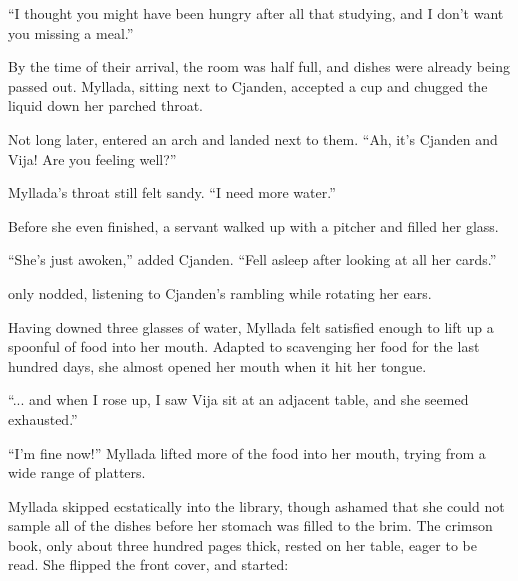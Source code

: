 ``I thought you might have been hungry after all that studying, and I don't want you missing a meal.''

By the time of their arrival, the room was half full, and dishes were already being passed out. Myllada, sitting next to Cjanden, accepted a cup and chugged the liquid down her parched throat.

Not long later, \yronsyncra{} entered an arch and landed next to them. ``Ah, it's Cjanden and Vija! Are you feeling well?''

Myllada's throat still felt sandy. ``I need more water.''

Before she even finished, a servant walked up with a pitcher and filled her glass.

``She's just awoken,'' added Cjanden. ``Fell asleep after looking at all her cards.''

\yronsyncra{} only nodded, listening to Cjanden's rambling while rotating her ears.

Having downed three glasses of water, Myllada felt satisfied enough to lift up a spoonful of food into her mouth. Adapted to scavenging her food for the last hundred days, she almost opened her mouth when it hit her tongue.

``... and when I rose up, I saw Vija sit at an adjacent table, and she seemed exhausted.''

``I'm fine now!'' Myllada lifted more of the food into her mouth, trying from a wide range of platters.

\centeredstars

Myllada skipped ecstatically into the library, though ashamed that she could not sample all of the dishes before her stomach was filled to the brim. The crimson book, only about three hundred pages thick, rested on her table, eager to be read. She flipped the front cover, and started:


